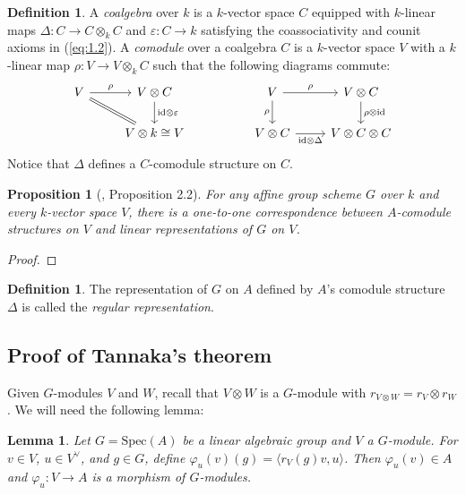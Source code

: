 \documentclass[10pt]{amsart}
\numberwithin{equation}{section}
\newcommand{\vp}{\varphi}
\newcommand{\ve}{\varepsilon}
\newcommand{\Spec}{\mathrm{Spec}}
\newcommand{\id}{\mathrm{id}}
\theoremstyle{plain}
\newtheorem{prop}[thm]{Proposition}
\newtheorem{lem}[thm]{Lemma}
\theoremstyle{definition}
\newtheorem{defn}[thm]{Definition}
\theoremstyle{remark}
\begin{document}
\begin{defn}
    A \emph{coalgebra} over $k$ is a $k$-vector space $C$ equipped with $k$-linear maps $\Delta: C \to C \otimes_k C$ and $\ve: C \to k$ satisfying the coassociativity and counit axioms in (\ref{eq:1.2}). A \emph{comodule} over a coalgebra $C$ is a $k$-vector space $V$ with a $k$-linear map $\rho: V \to V \otimes_k C$ such that the following diagrams commute:
    \begin{equation}\begin{tikzcd}
    V & {V \otimes C} && V & {V \otimes C} \\
    & {V\otimes k \cong V} && {V \otimes C} & {V \otimes C \otimes C}
    \arrow["\rho", from=1-1, to=1-2]
    \arrow[equals, from=1-1, to=2-2]
    \arrow["{\id \otimes \ve}", from=1-2, to=2-2]
    \arrow["\rho", from=1-4, to=1-5]
    \arrow["\rho"', from=1-4, to=2-4]
    \arrow["{\rho \otimes \id}", from=1-5, to=2-5]
    \arrow["{\id \otimes \Delta }"', from=2-4, to=2-5]
\end{tikzcd}\end{equation}
Notice that $\Delta$ defines a $C$-comodule structure on $C$.
\end{defn}

\begin{prop}[\cite{deligne1982tannakian}, Proposition 2.2]\label{prop:DM2.2}
    For any affine group scheme $G$ over $k$ and every $k$-vector space $V$, there is a one-to-one correspondence between $A$-comodule structures on $V$ and linear representations of $G$ on $V$.
\end{prop}
\begin{proof}

\end{proof}
\begin{defn}
    The representation of $G$ on $A$ defined by $A$'s comodule structure $\Delta$ is called the \emph{regular representation}.
\end{defn}

\subsection{Proof of Tannaka's theorem} 
Given $G$-modules $V$ and $W$, recall that $V \otimes W$ is a $G$-module with $r_{V \otimes W} = r_V \otimes r_W$. We will need the following lemma:
\begin{lem}\label{lem:1}
    Let $G = \Spec(A)$ be a linear algebraic group and $V$ a $G$-module. For $v \in V$, $u \in V^\vee$, and $g \in G$, define $\vp_u(v)(g) = \langle r_V(g)v, u \rangle$. Then $\vp_u(v) \in A$ and $\vp_u: V \to A$ is a morphism of $G$-modules.
\end{lem}
\end{document}
